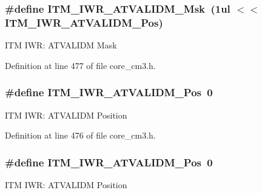 \subsubsection[{\texorpdfstring{I\+T\+M\+\_\+\+I\+W\+R\+\_\+\+A\+T\+V\+A\+L\+I\+D\+M\+\_\+\+Msk}{ITM_IWR_ATVALIDM_Msk}}]{\setlength{\rightskip}{0pt plus 5cm}\#define I\+T\+M\+\_\+\+I\+W\+R\+\_\+\+A\+T\+V\+A\+L\+I\+D\+M\+\_\+\+Msk~(1ul $<$$<$ I\+T\+M\+\_\+\+I\+W\+R\+\_\+\+A\+T\+V\+A\+L\+I\+D\+M\+\_\+\+Pos)}\hypertarget{group___c_m_s_i_s___c_m3___i_t_m_ga67b969f8f04ed15886727788f0e2ffd7}{}\label{group___c_m_s_i_s___c_m3___i_t_m_ga67b969f8f04ed15886727788f0e2ffd7}
I\+TM I\+WR\+: A\+T\+V\+A\+L\+I\+DM Mask 

Definition at line 477 of file core\+\_\+cm3.\+h.

\subsubsection[{\texorpdfstring{I\+T\+M\+\_\+\+I\+W\+R\+\_\+\+A\+T\+V\+A\+L\+I\+D\+M\+\_\+\+Pos}{ITM_IWR_ATVALIDM_Pos}}]{\setlength{\rightskip}{0pt plus 5cm}\#define I\+T\+M\+\_\+\+I\+W\+R\+\_\+\+A\+T\+V\+A\+L\+I\+D\+M\+\_\+\+Pos~0}\hypertarget{group___c_m_s_i_s___c_m3___i_t_m_ga04d3f842ad48f6a9127b4cecc963e1d7}{}\label{group___c_m_s_i_s___c_m3___i_t_m_ga04d3f842ad48f6a9127b4cecc963e1d7}
I\+TM I\+WR\+: A\+T\+V\+A\+L\+I\+DM Position 

Definition at line 476 of file core\+\_\+cm3.\+h.

\subsubsection[{\texorpdfstring{I\+T\+M\+\_\+\+I\+W\+R\+\_\+\+A\+T\+V\+A\+L\+I\+D\+M\+\_\+\+Pos}{ITM_IWR_ATVALIDM_Pos}}]{\setlength{\rightskip}{0pt plus 5cm}\#define I\+T\+M\+\_\+\+I\+W\+R\+\_\+\+A\+T\+V\+A\+L\+I\+D\+M\+\_\+\+Pos~0}\hypertarget{group___c_m_s_i_s___c_m3___i_t_m_ga04d3f842ad48f6a9127b4cecc963e1d7}{}\label{group___c_m_s_i_s___c_m3___i_t_m_ga04d3f842ad48f6a9127b4cecc963e1d7}
I\+TM I\+WR\+: A\+T\+V\+A\+L\+I\+DM Position 

